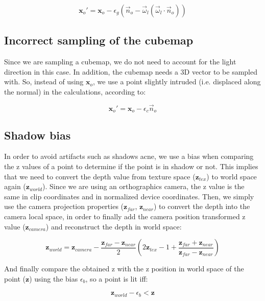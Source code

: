 $$
\mathbf{x}_o' = \mathbf{x}_o - \epsilon_g (\vec{n}_o - \vec{\omega}_l ( \vec{\omega}_l \cdot  \vec{n}_o))
$$

\subsection{Incorrect sampling of the cubemap}

Since we are sampling a cubemap, we do not need to account for the light direction in this case. In addition, the cubemap needs a 3D vector to be sampled with. So, instead of using $\mathbf{x}_o$, we use a point slightly intruded (i.e. displaced along the normal) in the calculations, according to:

$$
\mathbf{x}_o' = \mathbf{x}_o - \epsilon_c \vec{n}_o
$$

\subsection{Shadow bias}

In order to avoid artifacts such as shadows acne, we use a bias when comparing the z values of a point to determine if the point is in shadow or not. This implies that we need to convert the depth value from texture space ($\mathbf{z}_{tex}$) to world space again ($\mathbf{z}_{world}$). Since we are using an orthographics camera, the z value is the same in clip coordinates and in normalized device coordinates. Then, we simply use the camera projection properties ($\mathbf{z}_{far}$, $\mathbf{z}_{near}$) to convert the depth into the camera local space, in order to finally add the camera position transformed z value ($\mathbf{z}_{camera}$) and reconstruct the depth in world space:

$$
\mathbf{z}_{world} = \mathbf{z}_{camera} - \frac{\mathbf{z}_{far} - \mathbf{z}_{near}}{2} \left( 2 \mathbf{z}_{tex} - 1 + \frac{\mathbf{z}_{far} + \mathbf{z}_{near}}{\mathbf{z}_{far} - \mathbf{z}_{near}}\right)
$$
		
And finally compare the obtained z with the z position in world space of the point ($\mathbf{z}$) using the bias $\epsilon_b$, so a point is lit iff:

$$
\mathbf{z}_{world} - \epsilon_b < \mathbf{z}
$$		

